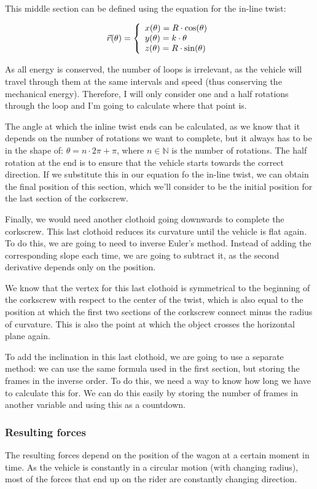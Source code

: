 \documentclass[12pt,twoside,a4paper]{article}
\renewcommand{\Bbb}[1]{\mathbb{#1}}
\begin{document}
	This middle section can be defined using the equation for the in-line twist:
	
	$$\vec{r}(\theta) = \left\{\begin{array}{l}
		x(\theta) = R \cdot \cos(\theta) \cr
		y(\theta) = k \cdot \theta \cr
		z(\theta) = R \cdot \sin(\theta)
	\end{array}\right.$$
	
	As all energy is conserved, the number of loops is irrelevant, as the vehicle will travel through them at the same intervals and speed (thus conserving the mechanical energy). Therefore, I will only consider one and a half rotations through the loop and I'm going to calculate where that point is.
	
	The angle at which the inline twist ends can be calculated, as we know that it depends on the number of rotations we want to complete, but it always has to be in the shape of: $\theta = n \cdot 2\pi + \pi$, where $n \in \Bbb{N}$ is the number of rotations. The half rotation at the end is to ensure that the vehicle starts towards the correct direction. If we substitute this in our equation fo the in-line twist, we can obtain the final position of this section, which we'll consider to be the initial position for the last section of the corkscrew.
	
	Finally, we would need another clothoid going downwards to complete the corkscrew. This last clothoid reduces its curvature until the vehicle is flat again. To do this, we are going to need to inverse Euler's method. Instead of adding the corresponding slope each time, we are going to subtract it, as the second derivative depends only on the position.
	
	We know that the vertex for this last clothoid is symmetrical to the beginning of the corkscrew with respect to the center of the twist, which is also equal to the position at which the first two sections of the corkscrew connect minus the radius of curvature. This is also the point at which the object crosses the horizontal plane again.
	
	To add the inclination in this last clothoid, we are going to use a separate method: we can use the same formula used in the first section, but storing the frames in the inverse order. To do this, we need a way to know how long we have to calculate this for. We can do this easily by storing the number of frames in another variable and using this as a countdown.
	
	\subsubsection{Resulting forces}
	The resulting forces depend on the position of the wagon at a certain moment in time. As the vehicle is constantly in a circular motion (with changing radius), most of the forces that end up on the rider are constantly changing direction.
	
\end{document}
